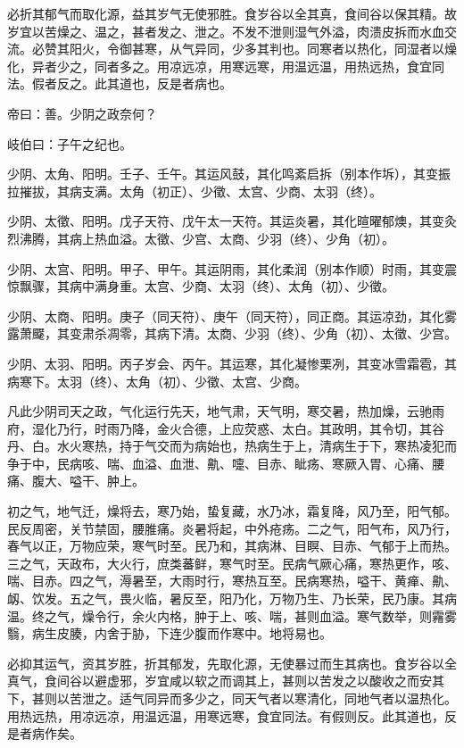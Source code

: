 \documentclass{article}%
\begin{document}
必折其郁气而取化源，益其岁气无使邪胜。食岁谷以全其真，食间谷以保其精。故岁宜以苦燥之、温之，甚者发之、泄之。不发不泄则湿气外溢，肉溃皮拆而水血交流。必赞其阳火，令御甚寒，从气异同，少多其判也。同寒者以热化，同湿者以燥化，异者少之，同者多之。用凉远凉，用寒远寒，用温远温，用热远热，食宜同法。假者反之。此其道也，反是者病也。

帝曰：善。少阴之政奈何？

岐伯曰：子午之纪也。

少阴、太角、阳明。壬子、壬午。其运风鼓，其化鸣紊启拆（别本作坼），其变振拉摧拔，其病支满。太角（初正）、少徵、太宫、少商、太羽（终）。

少阴、太徵、阳明。戊子天符、戊午太一天符。其运炎暑，其化暄曜郁燠，其变灸烈沸腾，其病上热血溢。太徵、少宫、太商、少羽（终）、少角（初）。

少阴、太宫、阳明。甲子、甲午。其运阴雨，其化柔润（别本作顺）时雨，其变震惊飘骤，其病中满身重。太宫、少商、太羽（终）、太角（初）、少徵。

少阴、太商、阳明。庚子（同天符）、庚午（同天符），同正商。其运凉劲，其化雾露萧飋，其变肃杀凋零，其病下清。太商、少羽（终）、少角（初）、太徵、少宫。

少阴、太羽、阳明。丙子岁会、丙午。其运寒，其化凝惨栗冽，其变冰雪霜雹，其病寒下。太羽（终）、太角（初）、少徵、太宫、少商。

凡此少阴司天之政，气化运行先天，地气肃，天气明，寒交暑，热加燥，云驰雨府，湿化乃行，时雨乃降，金火合德，上应荧惑、太白。其政明，其令切，其谷丹、白。水火寒热，持于气交而为病始也，热病生于上，清病生于下，寒热凌犯而争于中，民病咳、喘、血溢、血泄、鼽、嚏、目赤、眦疡、寒厥入胃、心痛、腰痛、腹大、嗌干、肿上。

初之气，地气迁，燥将去，寒乃始，蛰复藏，水乃冰，霜复降，风乃至，阳气郁。民反周密，关节禁固，腰脽痛。炎暑将起，中外疮疡。二之气，阳气布，风乃行，春气以正，万物应荣，寒气时至。民乃和，其病淋、目瞑、目赤、气郁于上而热。三之气，天政布，大火行，庶类蕃鲜，寒气时至。民病气厥心痛，寒热更作，咳、喘、目赤。四之气，溽暑至，大雨时行，寒热互至。民病寒热，嗌干、黄瘅、鼽、衂、饮发。五之气，畏火临，暑反至，阳乃化，万物乃生、乃长荣，民乃康。其病温。终之气，燥令行，余火内格，肿于上、咳、喘，甚则血溢。寒气数举，则霿雾翳，病生皮腠，内舍于胁，下连少腹而作寒中。地将易也。

必抑其运气，资其岁胜，折其郁发，先取化源，无使暴过而生其病也。食岁谷以全真气，食间谷以避虚邪，岁宜咸以软之而调其上，甚则以苦发之以酸收之而安其下，甚则以苦泄之。适气同异而多少之，同天气者以寒清化，同地气者以温热化。用热远热，用凉远凉，用温远温，用寒远寒，食宜同法。有假则反。此其道也，反是者病作矣。
\end{document}
